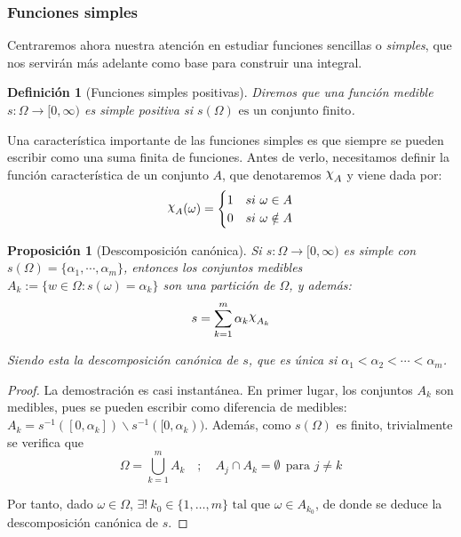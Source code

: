\documentclass[11pt, a4paper]{article}
\DeclareRobustCommand{\rchi}{{\mathpalette\irchi\relax}}
\newcommand{\irchi}[2]{\raisebox{\depth}{$#1\chi$}} %
\theoremstyle{theorem-style}
\newtheorem{nprop}{Proposición}[section]
\theoremstyle{definition-style}
\newtheorem{ndef}{Definición}[section]
\theoremstyle{remark-style}
\theoremstyle{example-style}
\begin{document}

\subsubsection*{Funciones simples}

Centraremos ahora nuestra atención en estudiar funciones sencillas o \textit{simples}, que nos servirán más adelante como base para construir una integral.

\begin{ndef}[Funciones simples positivas]
  Diremos que una función medible $s: \Omega \to [0,\infty)$ es simple positiva si 
  $s(\Omega) \text{ es un conjunto finito}$.
\end{ndef}

Una característica importante de las funciones simples es que siempre se pueden escribir como una suma finita de funciones. Antes de verlo, necesitamos definir la función característica de un conjunto $A$, que denotaremos $\rchi_A$ y viene dada por:
\[
  \rchi_A(\omega)= \begin{cases}
    1 & si \ \omega \in A\\
    0 & si \ \omega \notin A
  \end{cases}
\]

\begin{nprop}[Descomposición canónica]
  Si $s:\Omega \to [0,\infty)$ es simple con \mbox{$s(\Omega) =  \{\alpha_1,\cdots, \alpha_m\}$}, entonces los conjuntos medibles $A_k:= \{w \in \Omega: s(\omega)= \alpha_k\}$ son una partición de $\Omega$, y además:
  \[
    s = \sum_{k=1}^m \alpha_k \rchi_{A_k}
  \]
  
  Siendo esta la descomposición canónica de $s$, que es única si $\alpha_1 < \alpha_2 <  \cdots <\alpha_m$.
\end{nprop}

\begin{proof} La demostración es casi instantánea. En primer lugar, los conjuntos $A_k$ son medibles, pues se pueden escribir como diferencia de medibles: \mbox{$A_k = s^{-1}([0,\alpha_k])\backslash s^{-1}([0,\alpha_k))$.} Además, como $s(\Omega)$ es finito, trivialmente se verifica que $$\Omega = \bigcup_{k=1}^m A_k \quad ; \quad A_j \cap A_k = \emptyset \ \ \text{para } j \ne k$$

  Por tanto, dado $\omega \in \Omega$, $\exists ! \ k_0 \in \{1,\dots,m\} \text{ tal que } \omega \in A_{k_0}$, de donde se deduce la descomposición canónica de $s$.
\end{proof}
\end{document}

